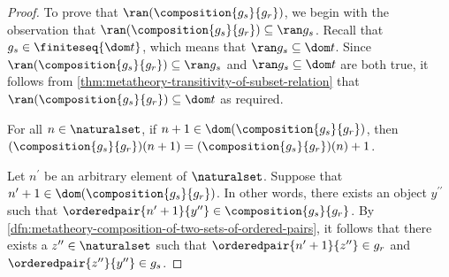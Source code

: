 \begin{proof}
    \vspace{0.3cm}
    \noindent
    To prove that \( \ran \mleft( \composition{g_{s}}{g_{r}} \mright) \), we begin with the observation that
    \( \ran \mleft( \composition{g_{s}}{g_{r}} \mright) \subseteq \ran g_{s} \).
    Recall that \( g_{s} \in \finiteseq{\dom t} \), which means that \( \ran g_{s} \subseteq \dom t \).
    Since \( \ran \mleft( \composition{g_{s}}{g_{r}} \mright) \subseteq \ran g_{s} \) and \( \ran g_{s} \subseteq \dom t \)
    are both true, it follows from \cref{thm:metatheory-transitivity-of-subset-relation} that \( \ran \mleft( \composition{g_{s}}{g_{r}} \mright) \subseteq \dom t \)
    as required.

    \begin{claim}
         \label{claim:the-values-of-gs-compose-gr-at-n-plus-one-is-the-successor-of-its-value-at-n}
        For all \( n \in \naturalset \), if \( n + 1 \in \dom \mleft( \composition{g_{s}}{g_{r}} \mright) \),
        then \( \mleft( \composition{g_{s}}{g_{r}} \mright)(n + 1) = \mleft( \composition{g_{s}}{g_{r}} \mright)(n) + 1\).
    \end{claim}
    \noindent
    Let \( n^{\prime} \) be an arbitrary element of \( \naturalset \).
    Suppose that \( n^{\prime} + 1 \in \dom \mleft( \composition{g_{s}}{g_{r}} \mright) \).
    In other words, there exists an object \( y^{\prime\prime} \) such that \( \orderedpair{n^{\prime} + 1}{y^{\prime\prime}} \in \composition{g_{s}}{g_{r}} \).
    By \cref{dfn:metatheory-composition-of-two-sets-of-ordered-pairs}, it follows that
    there exists a \( z^{\prime\prime} \in \naturalset \) such that \( \orderedpair{n^{\prime} + 1}{z^{\prime\prime}} \in g_{r} \)
    and \( \orderedpair{z^{\prime\prime}}{y^{\prime\prime}} \in g_{s} \).
    

\end{proof}
